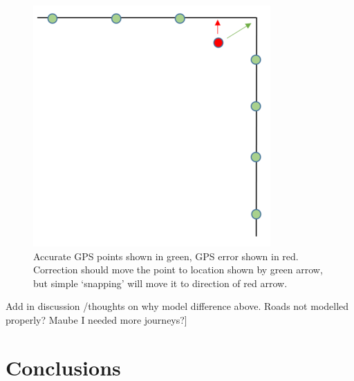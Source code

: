 \begin{figure}[H]
\centering
\includegraphics[scale=0.7]{images/gps_snapping_error.png}
\caption{Accurate GPS points shown in green, GPS error shown in red. Correction should move the point to location shown by green arrow, but simple ‘snapping’ will move it to direction of red arrow.}
\label{fig:gps_snapping_error}
\end{figure}

Add in discussion /thoughts on why model difference above. Roads not modelled properly? Maube I needed more journeys?]

\section{Conclusions}
\label{sec:4conclusions}

